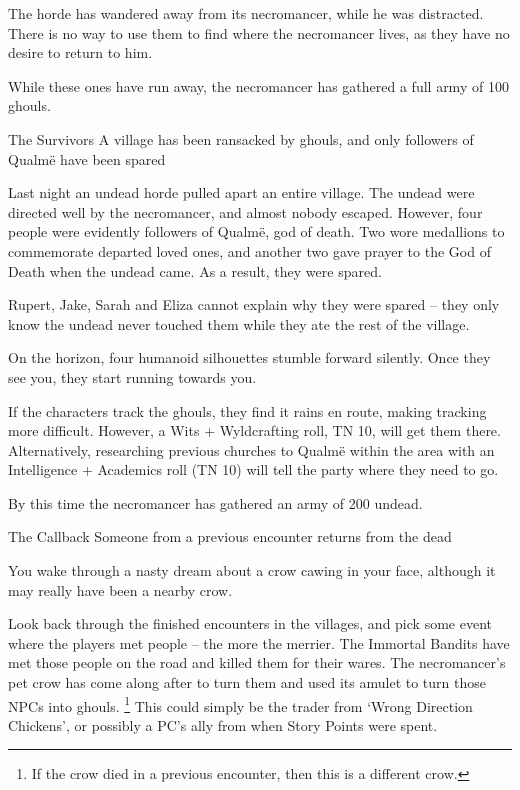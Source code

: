 \begin{multicols}{2}
The horde has wandered away from its necromancer, while he was distracted.
There is no way to use them to find where the necromancer lives, as they have no desire to return to him.

While these ones have run away, the necromancer has gathered a full army of 100 ghouls.

{The Survivors}%
{A village has been ransacked by ghouls, and only followers of Qualm\"{e} have been spared}%

Last night an undead horde pulled apart an entire village.  The undead were directed well by the necromancer, and almost nobody escaped.
However, four people were evidently followers of Qualm\"{e}, god of death.
Two wore medallions to commemorate departed loved ones, and another two gave prayer to the God of Death when the undead came.
As a result, they were spared.

Rupert, Jake, Sarah and Eliza cannot explain why they were spared -- they only know the undead never touched them while they ate the rest of the village.

\begin{boxtext}

	On the horizon, four humanoid silhouettes stumble forward silently.  Once they see you, they start running towards you.

\end{boxtext}

If the characters track the ghouls, they find it rains en route, making tracking more difficult.
However, a Wits + Wyldcrafting roll, TN 10, will get them there.
Alternatively, researching previous churches to Qualm\"{e} within the area with an Intelligence + Academics roll (TN 10) will tell the party where they need to go.

By this time the necromancer has gathered an army of 200 undead.

{The Callback}%
{Someone from a previous encounter returns from the dead}%

\begin{boxtext}

	You wake through a nasty dream about a crow cawing in your face, although it may really have been a nearby crow.

\end{boxtext}

Look back through the finished encounters in the villages, and pick some event where the players met people -- the more the merrier.
The Immortal Bandits have met those people on the road and killed them for their wares.
The necromancer's pet crow has come along after to turn them and used its amulet to turn those NPCs into ghouls.
\footnote{If the crow died in a previous encounter, then this is a different crow.}
This could simply be the trader from `Wrong Direction Chickens', or possibly a PC's ally from when Story Points were spent.


\end{multicols}
